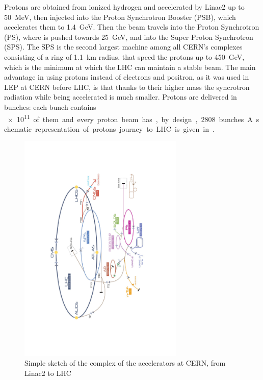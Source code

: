 Protons are obtained from ionized hydrogen and accelerated by Linac2 up to \SI{50}{\MeV}, then injected into the Proton Synchrotron Booster (PSB), which accelerates them to \SI{1.4}{\GeV}. Then the beam travels into the Proton Synchrotron (PS), where is pushed towards \SI{25}{\GeV}, and into the Super Proton Synchrotron (SPS). The SPS is the second largest machine among all CERN's complexes consisting of a ring of \SI{1.1}{\km} radius, that speed the protons up to \SI{450}{\GeV}, which is the minimum at which the LHC can maintain a stable beam. The main advantage in using protons instead of electrons and positron, as it was used in LEP at CERN before LHC, is that thanks to their higher mass the syncrotron radiation while being accelerated is much smaller. Protons are delivered in bunches: each bunch contains \SI{e11} of them and every proton beam has, by design, 2808 bunches. A schematic representation of protons journey to LHC is given in \Fig{\ref{fig:accelerators}}.

\begin{figure}[tp]
	\centering
	\includegraphics[width=0.70\textwidth,angle=-90]{LHC_ATLAS/CERNaccelerators}
	\caption{Simple sketch of the complex of the accelerators at CERN, from Linac2 to LHC}	
	\label{fig:accelerators}
\end{figure}

